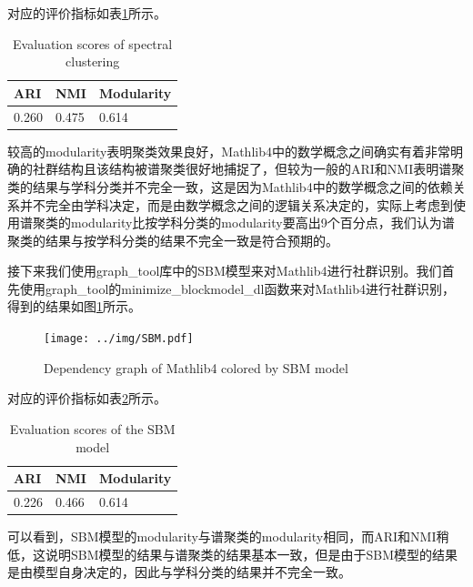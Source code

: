 对应的评价指标如表\ref{tab:score}所示。
\begin{table}[H]
  \centering
  \begin{tabular}{lll}
    \toprule
    ARI & NMI & Modularity\\
    \midrule
    0.260 & 0.475 & 0.614\\
    \bottomrule
  \end{tabular}
  \caption{Evaluation scores of spectral clustering}
  \label{tab:score}
\end{table}

较高的modularity表明聚类效果良好，Mathlib4中的数学概念之间确实有着非常明确的社群结构且该结构被谱聚类很好地捕捉了，但较为一般的ARI和NMI表明谱聚类的结果与学科分类并不完全一致，这是因为Mathlib4中的数学概念之间的依赖关系并不完全由学科决定，而是由数学概念之间的逻辑关系决定的，实际上考虑到使用谱聚类的modularity比按学科分类的modularity要高出9个百分点，我们认为谱聚类的结果与按学科分类的结果不完全一致是符合预期的。

接下来我们使用graph\_tool库中的SBM模型来对Mathlib4进行社群识别。我们首先使用graph\_tool的minimize\_blockmodel\_dl函数来对Mathlib4进行社群识别，得到的结果如图\ref{fig:SBM}所示。

\begin{figure}[H]
    \centering
    \texttt{[image: ../img/SBM.pdf]}
    \caption{Dependency graph of Mathlib4 colored by SBM model}
    \label{fig:SBM}
\end{figure}

对应的评价指标如表\ref{tab:score2}所示。
\begin{table}[H]
  \centering
  \begin{tabular}{lll}
    \toprule
    ARI & NMI & Modularity\\
    \midrule
    0.226 & 0.466 & 0.614\\
    \bottomrule
  \end{tabular}
  \caption{Evaluation scores of the SBM model}
  \label{tab:score2}
\end{table}

可以看到，SBM模型的modularity与谱聚类的modularity相同，而ARI和NMI稍低，这说明SBM模型的结果与谱聚类的结果基本一致，但是由于SBM模型的结果是由模型自身决定的，因此与学科分类的结果并不完全一致。





